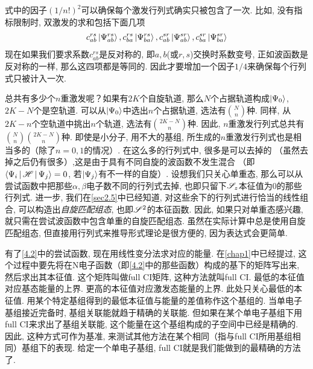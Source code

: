式中的因子$(1/n!)^2$可以确保每个激发行列式确实只被包含了一次. 比如, 没有指标限制时, 双激发的求和包括下面几项
\begin{align*}
c_{ab}^{rs}\Ket{\Psi_{ab}^{rs}}, 
c_{ba}^{rs}\Ket{\Psi_{ba}^{rs}}, 
c_{ab}^{sr}\Ket{\Psi_{ab}^{sr}},
c_{ba}^{sr}\Ket{\Psi_{ba}^{sr}}
\end{align*}
现在如果我们要求系数$c_{ab}^{rs}$是反对称的, 即$a,b$(或$r,s$)交换时系数变号, 正如波函数是反对称的一样, 那么这四项都是等同的. 因此才要增加一个因子$1/4$来确保每个行列式只被计入一次.

总共有多少个$n$重激发呢？如果有$2K$个自旋轨道, 那么$N$个占据轨道构成$\Ket{\Psi_0}$, $2K-N$个是空轨道. 可以从$\Ket{\Psi_0}$中选出$n$个占据轨道, 选法有$\binom{N}{n}$种. 同样, 从$2K-n$个空轨道中挑出$n$个轨道, 选法有$\binom{2K-N}{n}$种. 因此, $n$重激发行列式总共有$\binom{N}{n}\binom{2K-N}{n}$种. 即使是小分子, 用不大的基组, 所生成的$n$重激发行列式也是相当多的（除了$n=0,1$的情况）. 在这么多的行列式中, 很多是可以去掉的 （虽然去掉之后仍有很多）,这是由于具有不同自旋的波函数不发生混合 （即$\Braket{\Psi_i|\mathscr{H}|\Psi_j}=0$, 若$\Ket{\Psi_j}$有不一样的自旋）. 设想我们只关心单重态, 那么可以从尝试函数中把那些$\alpha,\beta$电子数不同的行列式去掉, 也即只留下$\mathscr{S}_z$本征值为0的那些行列式. 进一步, 我们在\ref{sec2.5}中已经知道, 对这些余下的行列式进行恰当的线性组合, 可以构造出\emph{自旋匹配组态}, 也即$\mathscr{S}^2$的本征函数. 因此, 如果只对单重态感兴趣, 就只需在尝试波函数中包含单重的自旋匹配组态. 虽然在实际计算中总是使用自旋匹配组态, 但直接用行列式来推导形式理论是很方便的, 因为表达式会更简单.

有了\eqref{4.2}中的尝试函数, 现在用线性变分法求对应的能量. 在\ref{chap1}中已经提过, 这个过程中要先将\ha 在N电子函数（即\eqref{4.2}中的那些函数）构成的基下的矩阵写出来, 然后求出其本征值. 这个矩阵叫做full CI矩阵, 这种方法就叫full CI. 最低的本征值对应基态能量的上界. 更高的本征值对应激发态能量的上界. 此处只关心最低的本征值. 用某个特定基组得到的最低本征值与\hft 能量的差值称作这个基组的. 当单电子基组接近完备时, 基组关联能就趋于精确的关联能. 但如果在某个单电子基组下用full CI来求出了基组关联能, 这个能量在这个基组构成的子空间中已经是精确的. 因此, 这种方式可作为基准, 来测试其他方法在某个相同（指与full CI所用基组相同）基组下的表现. 给定一个单电子基组, full CI就是我们能做到的最精确的方法了.

